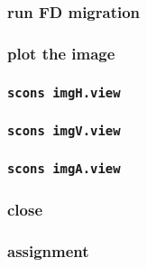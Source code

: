 \begin{frame} \frametitle{run FD migration}
\end{frame}
\cwpnote{}

\begin{frame} \frametitle{plot the image}
\end{frame}
\cwpnote{}

\begin{frame} \frametitle{\texttt{scons imgH.view}}
\end{frame}
\begin{frame} \frametitle{\texttt{scons imgV.view}}
\end{frame}
\begin{frame} \frametitle{\texttt{scons imgA.view}}
\end{frame}

\begin{frame} \frametitle{close}
\end{frame}
\cwpnote{}

\begin{frame}

  
  \vfill


  \vfill
  
  \begin{center}
  \end{center}
  
\end{frame}
\cwpnote{}


\begin{frame} \frametitle{assignment}

  
\end{frame}
\cwpnote{}

